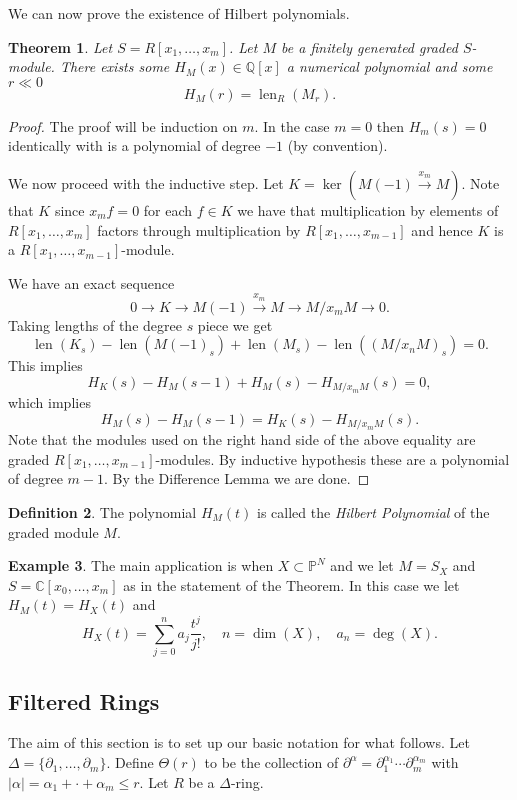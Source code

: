 \documentclass[12pt]{book}
\numberwithin{equation}{section}
\newtheorem{theorem}{Theorem}[subsection]
\theoremstyle{definition}
\newtheorem{definition}[theorem]{Definition}
\newtheorem{example}[theorem]{Example}
\theoremstyle{remark}
\newcommand{\QQ}{\mathbb{Q}}
\newcommand{\CC}{\mathbb{C}}
\newcommand{\PP}{\mathbb{P}}
\newcommand{\len}{\operatorname{len}}
\begin{document}
We can now prove the existence of Hilbert polynomials.
\begin{theorem}
	Let $S=R[x_1,\ldots,x_m]$. 
	Let $M$ be a finitely generated graded $S$-module. 
	There exists some $H_M(x) \in \QQ[x]$ a numerical polynomial and some $r\ll 0$ 
	$$ H_M(r) = \len_R(M_r). $$
\end{theorem}
\begin{proof}
	The proof will be induction on $m$. 
	In the case $m=0$ then $H_m(s)=0$ identically with is a polynomial of degree $-1$ (by convention).
	
	We now proceed with the inductive step. 
	Let $K = \ker( M(-1) \xrightarrow{x_m} M)$. 
	Note that $K$ since $x_m f =0$ for each $f \in K$ we have that multiplication by elements of $R[x_1,\ldots,x_m]$ factors through multiplication by $R[x_1,\ldots,x_{m-1}]$ and hence $K$ is a $R[x_1,\ldots,x_{m-1}]$-module.
	
	We have an exact sequence 
	$$ 0 \to K \to M(-1) \xrightarrow{x_m} M \to M/x_m M \to 0.$$
	Taking lengths of the degree $s$ piece we get 
	$$ \len(K_s) - \len( M(-1)_s) + \len(M_s) - \len( (M/x_nM)_s) =0.$$
	This implies 
	$$ H_K(s) - H_M(s-1) + H_M(s) - H_{M/x_mM}(s) =0,$$
	which implies 
	$$ H_M(s) - H_M(s-1) = H_K(s) - H_{M/x_mM}(s). $$
	Note that the modules used on the right hand side of the above equality are graded $R[x_1,\ldots,x_{m-1}]$-modules.  
	By inductive hypothesis these are a polynomial of degree $m-1$. 
	By the Difference Lemma we are done.
\end{proof}

\begin{definition}
	The polynomial $H_M(t)$ is called the \emph{Hilbert Polynomial} of the graded module $M$.
\end{definition}

\begin{example}
	The main application is when $X \subset \PP^N$ and we let $M=S_X$ and $S= \CC[x_0,\ldots,x_m]$ as in the statement of the Theorem. 
	In this case we let $H_M(t) = H_X(t)$ and 
	$$ H_X(t) = \sum_{j=0}^n a_j \frac{t^j}{j!}, \quad n = \dim(X), \quad a_n = \deg(X).$$
\end{example}

\subsection{Filtered Rings}
The aim of this section is to set up our basic notation for what follows. 
Let $\Delta = \lbrace \partial_1,\ldots, \partial_m\rbrace$.
Define $\Theta(r)$ to be the collection of $\partial^{\alpha}=\partial_1^{\alpha_1} \cdots \partial_m^{\alpha_m}$ with $\vert \alpha \vert = \alpha_1 + \cdot + \alpha_m \leq r$.
Let $R$ be a $\Delta$-ring. 
\end{document}
